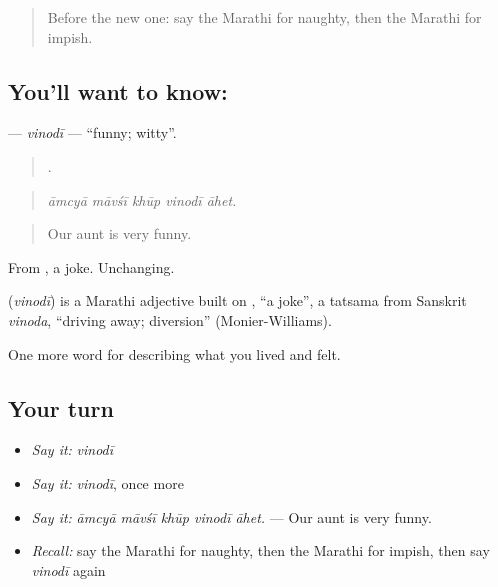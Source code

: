\begin{quote}
Before the new one: say the Marathi for naughty, then the Marathi for impish.
\end{quote}

\subsection*{You'll want to know: }
\textbf{} — \emph{vinodī} — \textquotedblleft{}funny; witty\textquotedblright{}.

\begin{quote}
    .
\end{quote}

\begin{quote}
\emph{āmcyā māvśī khūp vinodī āhet.}
\end{quote}

\begin{quote}
Our aunt is very funny.
\end{quote}

From , a joke. Unchanging.

\begin{cousinweb}
\textbf{} (\emph{vinodī}) is a Marathi adjective built on , \textquotedblleft{}a joke\textquotedblright{}, a tatsama from Sanskrit \emph{vinoda}, \textquotedblleft{}driving away; diversion\textquotedblright{} (Monier-Williams).
\end{cousinweb}

\begin{grammarlens}[title={What you've built}]
One more word for describing what you lived and felt.
\end{grammarlens}

\subsection*{Your turn}
\begin{itemize}
\raggedright
  \item \emph{Say it:} \emph{vinodī}
  \item \emph{Say it:} \emph{vinodī}, once more
  \item \emph{Say it:} \emph{āmcyā māvśī khūp vinodī āhet.} — Our aunt is very funny.
  \item \emph{Recall:} say the Marathi for naughty, then the Marathi for impish, then say \emph{vinodī} again
\end{itemize}

